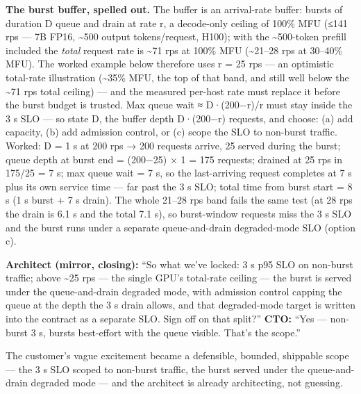 \textbf{The burst buffer, spelled out.} The buffer is an arrival-rate
buffer: bursts of duration D queue and drain at rate r, a decode-only
ceiling of 100\% MFU (≤141 rps --- 7B FP16, \textasciitilde500 output
tokens/request, H100); with the \textasciitilde500-token prefill
included the \emph{total} request rate is \textasciitilde71 rps at 100\%
MFU (\textasciitilde21--28 rps at 30--40\% MFU). The worked example
below therefore uses r = 25 rps --- an optimistic total-rate
illustration (\textasciitilde35\% MFU, the top of that band, and still
well below the \textasciitilde71 rps total ceiling) --- and the measured
per-host rate must replace it before the burst budget is trusted. Max
queue wait ≈ D·(200−r)/r must stay inside the 3 s SLO --- so state D,
the buffer depth D·(200−r) requests, and choose: (a) add capacity, (b)
add admission control, or (c) scope the SLO to non-burst traffic.
Worked: D = 1 s at 200 rps → 200 requests arrive, 25 served during the
burst; queue depth at burst end = (200−25) × 1 = 175 requests; drained
at 25 rps in 175/25 = 7 s; max queue wait = 7 s, so the last-arriving
request completes at 7 s plus its own service time --- far past the 3 s
SLO; total time from burst start = 8 s (1 s burst + 7 s drain). The
whole 21--28 rps band fails the same test (at 28 rps the drain is 6.1 s
and the total 7.1 s), so burst-window requests miss the 3 s SLO and the
burst runs under a separate queue-and-drain degraded-mode SLO (option
c).

\textbf{Architect (mirror, closing):} ``So what we've locked: 3 s p95
SLO on non-burst traffic; above \textasciitilde25 rps --- the single
GPU's total-rate ceiling --- the burst is served under the
queue-and-drain degraded mode, with admission control capping the queue
at the depth the 3 s drain allows, and that degraded-mode target is
written into the contract as a separate SLO. Sign off on that split?''
\textbf{CTO:} ``Yes --- non-burst 3 s, bursts best-effort with the queue
visible. That's the scope.''

The customer's vague excitement became a defensible, bounded, shippable
scope --- the 3 s SLO scoped to non-burst traffic, the burst served
under the queue-and-drain degraded mode --- and the architect is already
architecting, not guessing.
